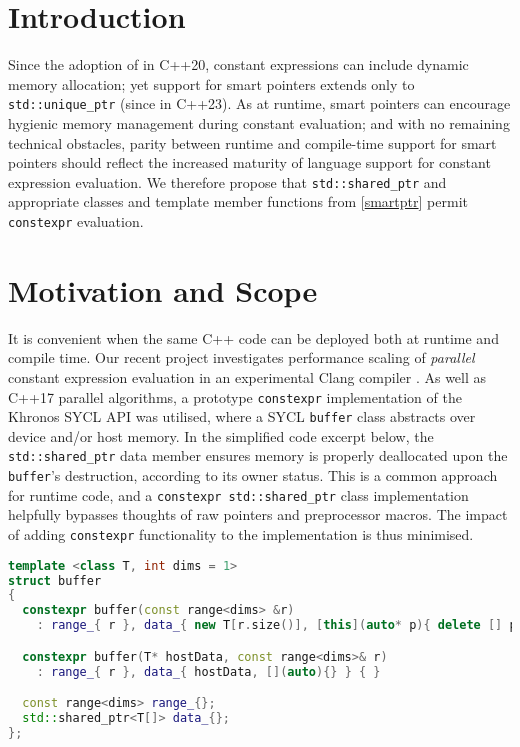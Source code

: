 \documentclass[10pt]{article}
\newcommand*{\wgxxi}[1]{[\href{https://wg21.link/#1}{#1}]}
\begin{document}
\section{Introduction}

Since the adoption of \cite{P0784R7} in C++20, constant expressions can include
dynamic memory allocation; yet support for smart pointers extends only to
\texttt{std::unique\_ptr} (since \cite{P2273R3} in C++23). As at runtime, smart
pointers can encourage hygienic memory management during constant evaluation;
and with no remaining technical obstacles, parity between runtime and
compile-time support for smart pointers should reflect the increased maturity
of language support for constant expression evaluation.  We therefore propose
that \texttt{std::shared\_ptr} and appropriate classes and template member
functions from \wgxxi{smartptr} permit \texttt{constexpr} evaluation.

\section{Motivation and Scope}

It is convenient when the same C++ code can be deployed both at runtime and
compile time. Our recent project investigates performance scaling of
\emph{parallel} constant expression evaluation in an experimental Clang
compiler \cite{ClangOz}. As well as C++17 parallel algorithms, a prototype
\texttt{constexpr} implementation of the Khronos SYCL API was utilised, where a
SYCL \texttt{buffer} class abstracts over device and/or host memory. In the
simplified code excerpt below, the \texttt{std::shared\_ptr} data member
ensures memory is properly deallocated upon the \texttt{buffer}'s destruction,
according to its owner status. This is a common approach for runtime code, and
a \texttt{constexpr std::shared\_ptr} class implementation helpfully bypasses
thoughts of raw pointers and preprocessor macros. The impact of adding
\texttt{constexpr} functionality to the implementation is thus
minimised.

\begin{lstlisting}[language=cpp]
template <class T, int dims = 1>
struct buffer
{
  constexpr buffer(const range<dims> &r)
    : range_{ r }, data_{ new T[r.size()], [this](auto* p){ delete [] p; } } { }

  constexpr buffer(T* hostData, const range<dims>& r)
    : range_{ r }, data_{ hostData, [](auto){} } { }

  const range<dims> range_{};
  std::shared_ptr<T[]> data_{};
};
\end{lstlisting}
\end{document}
